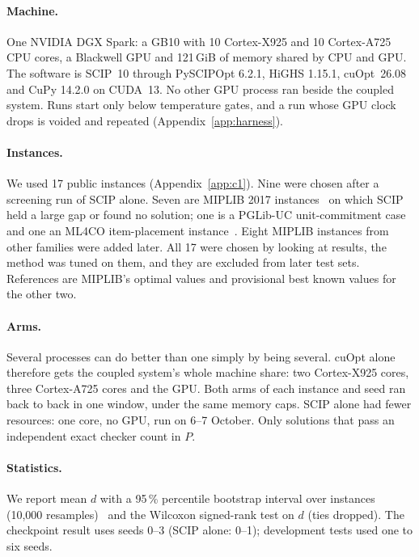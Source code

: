 \paragraph{Machine.} One NVIDIA DGX Spark: a GB10 with 10 Cortex-X925 and 10 Cortex-A725 CPU cores, a Blackwell GPU and
121\,GiB of memory shared by CPU and GPU. The software is SCIP~10 through PySCIPOpt 6.2.1, HiGHS 1.15.1, cuOpt~26.08
and CuPy 14.2.0 on CUDA~13. No other GPU process ran beside the coupled system. Runs start only below temperature
gates, and a run whose GPU clock drops is voided and repeated (Appendix~\ref{app:harness}).

\paragraph{Instances.} We used 17 public instances (Appendix~\ref{app:c1}). Nine were chosen after a screening run of
SCIP alone. Seven are MIPLIB 2017 instances~\citep{gleixner2021miplib} on which SCIP held a large gap or found no
solution; one is a PGLib-UC unit-commitment case~\citep{pglibuc2019,knueven2020uc} and one an ML4CO item-placement
instance~\citep{gasse2022ml4co}. Eight MIPLIB instances from other families were added later. All 17 were chosen by
looking at results, the method was tuned on them, and they are excluded from later test sets. References are MIPLIB's
optimal values and provisional best known values for the other two.

\paragraph{Arms.} Several processes can do better than one simply by being several. cuOpt alone therefore gets the
coupled system's whole machine share: two Cortex-X925 cores, three Cortex-A725 cores and the GPU. Both arms of each
instance and seed ran back to back in one window, under the same memory caps. SCIP alone had fewer resources: one core,
no GPU, run on 6--7 October. Only solutions that pass an independent exact checker count in $P$.

\paragraph{Statistics.} We report mean $d$ with a 95\,\% percentile bootstrap interval over instances (10{,}000
resamples)~\citep{dicicco1996bootstrap} and the Wilcoxon signed-rank test on $d$ (ties dropped). The checkpoint
result uses seeds 0--3 (SCIP alone: 0--1); development tests used one to six seeds.

